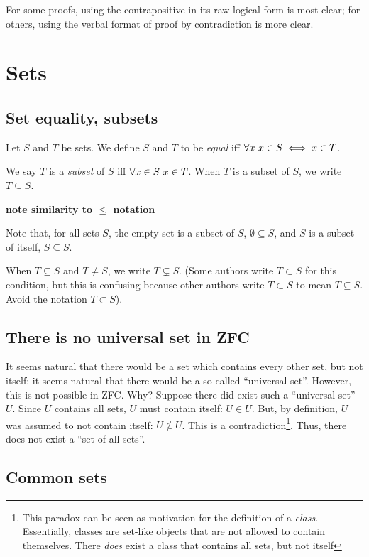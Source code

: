For some proofs, using the contrapositive in its raw logical form is most clear; for others, using the verbal format of proof by contradiction is more clear.

\newpage

\section{Sets}

\subsection*{Set equality, subsets}

Let $S$ and $T$ be sets. We define $S$ and $T$ to be \textit{equal} iff $\forall x \text{ } x \in S \iff x \in T$.

We say $T$ is a \textit{subset} of $S$ iff $\forall x \in S \text{ } x \in T$. When $T$ is a subset of $S$, we write $T \subseteq S$. 

\textbf{note similarity to $\leq$ notation}

Note that, for all sets $S$, the empty set is a subset of $S$, $\emptyset \subseteq S$, and $S$ is a subset of itself, $S \subseteq S$. 

When $T \subseteq S$ and $T \neq S$, we write $T \subsetneq S$. (Some authors write $T \subset S$ for this condition, but this is confusing because other authors write $T \subset S$ to mean $T \subseteq S$. Avoid the notation $T \subset S$).

\subsection*{There is no universal set in ZFC}

It seems natural that there would be a set which contains every other set, but not itself; it seems natural that there would be a so-called ``universal set''. However, this is not possible in ZFC. Why? Suppose there did exist such a ``universal set'' $U$. Since $U$ contains all sets, $U$ must contain itself: $U \in U$. But, by definition, $U$ was assumed to not contain itself: $U \notin U$. This is a contradiction\footnote{This paradox can be seen as motivation for the definition of a \textit{class}. Essentially, classes are set-like objects that are not allowed to contain themselves. There \textit{does} exist a class that contains all sets, but not itself}. Thus, there does not exist a ``set of all sets''.

\subsection*{Common sets}

